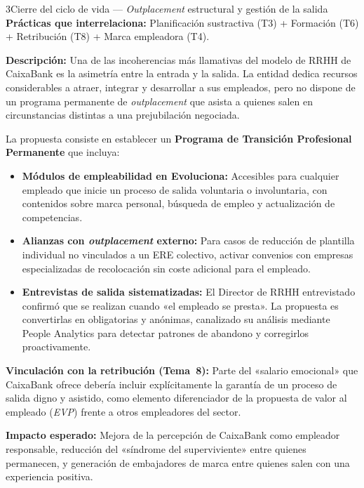 \begin{recomendacion}{3}{Cierre del ciclo de vida --- \textit{Outplacement} estructural y gestión de la salida}
\textbf{Prácticas que interrelaciona:} Planificación sustractiva (T3) + Formación (T6) + Retribución
(T8) + Marca empleadora (T4).

\medskip
\textbf{Descripción:}
Una de las incoherencias más llamativas del modelo de RRHH de CaixaBank
es la asimetría entre la entrada y la salida. La entidad dedica recursos
considerables a atraer, integrar y desarrollar a sus empleados, pero no
dispone de un programa permanente de \textit{outplacement} que asista
a quienes salen en circunstancias distintas a una prejubilación negociada.

La propuesta consiste en establecer un \textbf{Programa de Transición
Profesional Permanente} que incluya:
\begin{itemize}
  \item \textbf{Módulos de empleabilidad en Evoluciona:} Accesibles para
        cualquier empleado que inicie un proceso de salida voluntaria o
        involuntaria, con contenidos sobre marca personal, búsqueda de empleo
        y actualización de competencias.
  \item \textbf{Alianzas con \textit{outplacement} externo:} Para casos de
        reducción de plantilla individual no vinculados a un ERE colectivo,
        activar convenios con empresas especializadas de recolocación sin
        coste adicional para el empleado.
  \item \textbf{Entrevistas de salida sistematizadas:} El Director de RRHH
        entrevistado confirmó que se realizan cuando «el empleado se presta».
        La propuesta es convertirlas en obligatorias y anónimas, canalizado
        su análisis mediante People Analytics para detectar patrones de abandono
        y corregirlos proactivamente.
\end{itemize}
\textbf{Vinculación con la retribución (Tema~8):}
Parte del «salario emocional» que CaixaBank ofrece debería incluir explícitamente
la garantía de un proceso de salida digno y asistido, como elemento diferenciador
de la propuesta de valor al empleado (\textit{EVP}) frente a otros empleadores
del sector.

\medskip
\textbf{Impacto esperado:}
Mejora de la percepción de CaixaBank como empleador responsable,
reducción del «síndrome del superviviente» entre quienes permanecen,
y generación de embajadores de marca entre quienes salen con una
experiencia positiva.
\end{recomendacion}

